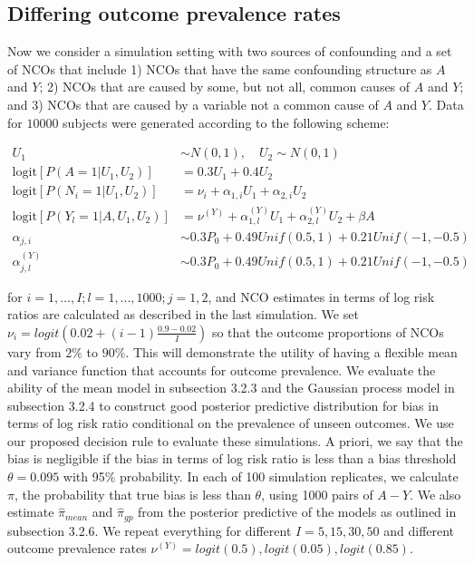 \subsection{Differing outcome prevalence rates}

Now we consider a simulation setting with two sources of confounding and a set of NCOs that include 1) NCOs that have the same confounding structure as $A$ and $Y$; 2) NCOs that are caused by some, but not all, common causes of $A$ and $Y$; and 3) NCOs that are caused by a variable not a common cause of $A$ and $Y$. Data for $10000$ subjects were generated according to the following scheme:

\begin{align*}
    U_1 &\sim N(0, 1), \quad U_2 \sim N(0, 1)\\
    \text{logit}[P(A=1|U_1, U_2)] &= 0.3 U_1 + 0.4 U_2\\
    \text{logit}[P(N_{i}=1|U_1, U_2)] &= \nu_i + \alpha_{1,i} U_1 + \alpha_{2,i} U_2 \\
    \text{logit}[P(Y_l=1|A, U_1, U_2)] &= \nu^{(Y)} + \alpha^{(Y)}_{1,l} U_1 + \alpha^{(Y)}_{2, l}U_2 + \beta A\\
    \alpha_{j,i} &\sim 0.3P_0 + 0.49 Unif(0.5, 1) + 0.21 Unif(-1, -0.5)\\
    \alpha^{(Y)}_{j,l} &\sim 0.3P_0 + 0.49 Unif(0.5, 1) + 0.21 Unif(-1, -0.5)
\end{align*}

\noindent for $i=1,..., I; l=1,...,1000; j=1,2$, and NCO estimates in terms of log risk ratios are calculated as described in the last simulation. We set $\nu_i = logit(0.02 + (i - 1)\frac{0.9-0.02}{I})$ so that the outcome proportions of NCOs vary from $2\%$ to $90\%$. This will demonstrate the utility of having a flexible mean and variance function that accounts for outcome prevalence. We evaluate the ability of the mean model in subsection 3.2.3 and the Gaussian process model in subsection 3.2.4 to construct good posterior predictive distribution for bias in terms of log risk ratio conditional on the prevalence of unseen outcomes. We use our proposed decision rule to evaluate these simulations. A priori, we say that the bias is negligible if the bias in terms of log risk ratio is less than a bias threshold $\theta = 0.095$ with 95$\%$ probability. In each of 100 simulation replicates, we calculate $\pi$, the probability that true bias is less than $\theta$, using 1000 pairs of $A-Y$. We also estimate $\hat{\pi}_{mean}$ and $\hat{\pi}_{gp}$ from the posterior predictive of the models as outlined in subsection 3.2.6. We repeat everything for different $I=5, 15, 30, 50$ and different outcome prevalence rates $\nu^{(Y)} = logit(0.5), logit(0.05), logit(0.85)$.

